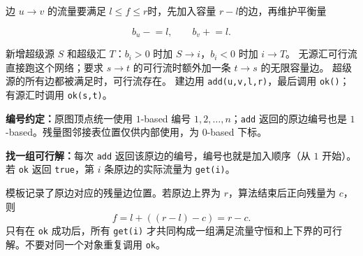 边 $u\to v$ 的流量要满足 $l\le f\le r$时，先加入容量 $r-l$的边，再维护平衡量

\[
  b_u\mathrel{-}=l,\qquad b_v\mathrel{+}=l.
\]

新增超级源 $S$ 和超级汇 $T$：$b_i>0$ 时加 $S\to i$，$b_i<0$ 时加 $i\to T$。
无源汇可行流直接跑这个网络；要求 $s\to t$ 的可行流时额外加一条
$t\to s$ 的无限容量边。
超级源的所有边都被满足时，可行流存在。
建边用 \texttt{add(u,v,l,r)}，最后调用 \texttt{ok()}；有源汇时调用 \texttt{ok(s,t)}。

\textbf{编号约定：}原图顶点统一使用 $1$-based 编号 $1,2,\ldots,n$；\texttt{add} 返回的原边编号也是 $1$-based。残量图邻接表位置仅供内部使用，为 $0$-based 下标。

\textbf{找一组可行解：}每次 \texttt{add} 返回该原边的编号，编号也就是加入顺序（从 $1$ 开始）。若 \texttt{ok} 返回 \texttt{true}，第 $i$ 条原边的实际流量为 \texttt{get(i)}。

模板记录了原边对应的残量边位置。若原边上界为 $r$，算法结束后正向残量为 $c$，则
\[
  f=l+((r-l)-c)=r-c.
\]
只有在 \texttt{ok} 成功后，所有 \texttt{get(i)} 才共同构成一组满足流量守恒和上下界的可行解。不要对同一个对象重复调用 \texttt{ok}。
